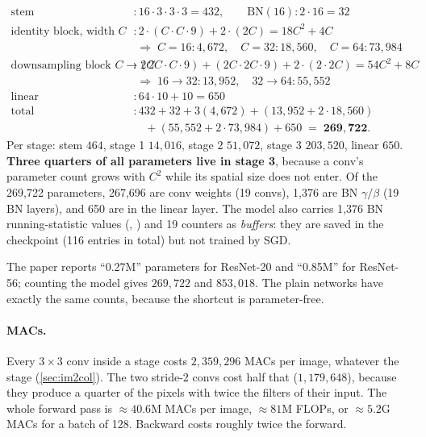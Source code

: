 \begin{shapebox}
\begin{align*}
\text{stem} &: 16\cdot3\cdot3\cdot3 = 432, \qquad \text{BN}(16): 2\cdot16 = 32\\
\text{identity block, width } C &: 2\cdot(C\cdot C\cdot 9) + 2\cdot(2C) = 18C^2 + 4C\\
  &\;\Rightarrow\; C{=}16: 4{,}672,\quad C{=}32: 18{,}560,\quad C{=}64: 73{,}984\\
\text{downsampling block } C\to2C &: (2C\cdot C\cdot9) + (2C\cdot2C\cdot9) + 2\cdot(2\cdot2C) = 54C^2+8C\\
  &\;\Rightarrow\; 16{\to}32: 13{,}952,\quad 32{\to}64: 55{,}552\\
\text{linear} &: 64\cdot10 + 10 = 650\\
\text{total} &: 432 + 32 + 3(4{,}672) + (13{,}952 + 2\cdot18{,}560)\\
  &\quad + (55{,}552 + 2\cdot73{,}984) + 650 \;=\; \mathbf{269{,}722} .
\end{align*}
Per stage: stem $464$, stage 1 $14{,}016$, stage 2 $51{,}072$, stage 3 $203{,}520$, linear $650$. \textbf{Three quarters of all parameters live in stage 3}, because a conv's parameter count grows with $C^2$ while its spatial size does not enter. Of the 269{,}722 parameters, 267{,}696 are conv weights (19 convs), 1{,}376 are BN $\gamma/\beta$ (19 BN layers), and 650 are in the linear layer. The model also carries 1{,}376 BN running-statistic values (, ) and 19  counters as \emph{buffers}: they are saved in the checkpoint (116  entries in total) but not trained by SGD.

The paper reports ``0.27M'' parameters for ResNet-20 and ``0.85M'' for ResNet-56; counting the model gives $269{,}722$ and $853{,}018$. The plain networks have exactly the same counts, because the shortcut is parameter-free.
\end{shapebox}

\paragraph{MACs.} Every $3{\times}3$ conv inside a stage costs $2{,}359{,}296$ MACs per image, whatever the stage (\cref{sec:im2col}). The two stride-2 convs cost half that ($1{,}179{,}648$), because they produce a quarter of the pixels with twice the filters of their input. The whole forward pass is $\approx 40.6$M MACs per image, $\approx 81$M FLOPs, or $\approx5.2$G MACs for a batch of 128. Backward costs roughly twice the forward.

